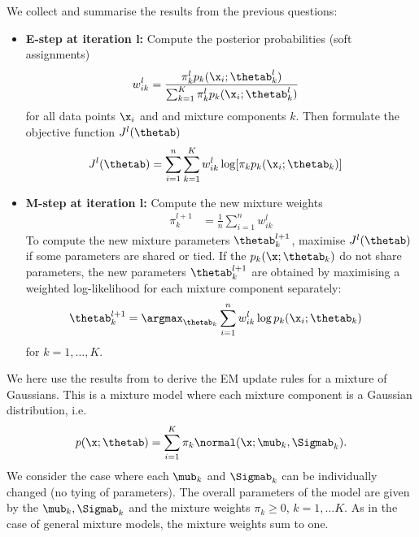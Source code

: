 \begin{exenumerate}
  \begin{solution}
    We collect and summarise the results from the previous questions:
    \begin{itemize}
    \item \textbf{E-step at iteration l:} Compute the posterior probabilities (soft assignments)
      \begin{align}
        w_{ik}^l & =  \frac{ \pi^l_k p_k(\x_i; \thetab^l_k)}{ \sum_{k=1}^K \pi^l_k p_k(\x_i; \thetab^l_k)} 
      \end{align}
      for all data points $\x_i$ and and mixture components $k$. Then formulate
      the objective function $J^l(\thetab)$
      \begin{align}
        J^l(\thetab) & = \sum_{i=1}^n  \sum_{k=1}^K w_{ik}^l  \log[  \pi_k  p_k(\x_i; \thetab_k) ]
      \end{align}
    \item  \textbf{M-step at iteration l:} Compute the new mixture weights
      \begin{align}
        \pi_k^{l+1} &=  \frac{1}{n}\sum_{i=1}^n w_{ik}^l
      \end{align}
      To compute the new mixture parameters $\thetab_k^{l+1}$, maximise
      $J^l(\thetab)$ if some parameters are shared or tied. If the $p_k(\x;
      \thetab_k)$ do not share parameters, the new parameters $\thetab_k^{l+1}$
      are obtained by maximising a weighted log-likelihood for each mixture
      component separately:
      \begin{align}
         \thetab_k^{l+1} &= \argmax_{\thetab_k} \sum_{i=1}^n  w_{ik}^l \log p_k(\x_i; \thetab_k)
      \end{align}
      for $k=1, \ldots, K$.
    \end{itemize}
  \end{solution}
    
\end{exenumerate}

 

\label{ex:EM-MoG}

We here use the results from  to derive the EM
update rules for a mixture of Gaussians. This is a mixture model where each
mixture component is a Gaussian distribution, i.e.
\begin{align}
  p(\x; \thetab) = \sum_{i=1}^K \pi_k \normal(\x; \mub_k, \Sigmab_k).
\end{align}
We consider the case where each $\mub_k$ and $\Sigmab_k$ can be individually
changed (no tying of parameters). The overall parameters of the model are given
by the $\mub_k, \Sigmab_k$ and the mixture weights $\pi_k\ge 0$, $k=1, \ldots
K$. As in the case of general mixture models, the mixture weights sum to one.

